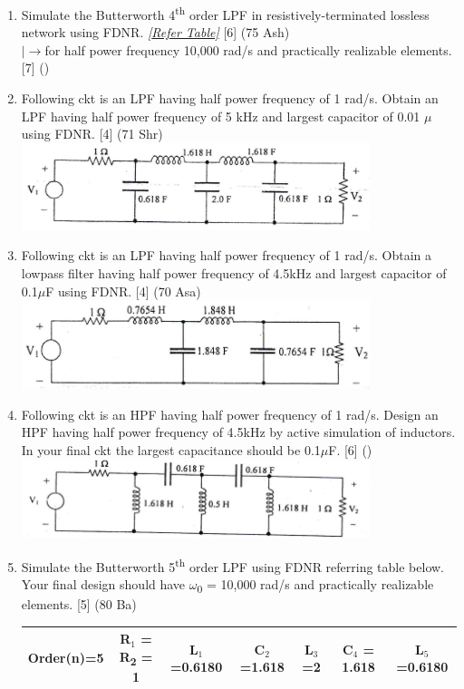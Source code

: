 \documentclass[12pt]{article}
\newcommand{\w}{\(\omega\)}
\newcommand{\lb}{\\$\left|\rightarrow\right.$}
\newcommand{\sub}[1]{\textsubscript{#1}}
\newcommand{\super}[1]{\textsuperscript{#1}}
\begin{document}
\begin{enumerate}
				\item Simulate the Butterworth 4\super{th} order LPF in resistively-terminated lossless network using FDNR. \textit{[\hyperref[sec:tables_81bh]{Refer Table]}} \hfill [6] (75 Ash)
				\lb for half power frequency 10,000 rad/s and practically realizable elements. \hfill [7] ()

				\item Following ckt is an LPF having half power frequency of 1 rad/s. Obtain an LPF having half power frequency of 5 kHz and largest capacitor of 0.01 $\mu$ using FDNR. \hfill [4] (71 Shr)\\
				\includegraphics[width=4in]{./pics/fd_22}

				\item Following ckt is an LPF having half power frequency of 1 rad/s. Obtain a lowpass filter having half power frequency of 4.5kHz and largest capacitor of 0.1$\mu$F using FDNR. \hfill [4] (70 Asa)\\
				\includegraphics[width=4in]{./pics/fd_8}

				\item Following ckt is an HPF having half power frequency of 1 rad/s. Design an HPF having half power frequency of 4.5kHz by active simulation of inductors. In your final ckt the largest capacitance should be 0.1$\mu$F. \hfill [6] ()\\
				\includegraphics[width=4in]{./pics/fd_24}

				\item Simulate the Butterworth 5\super{th} order LPF using FDNR referring table below. Your final design should have \w\sub{0} = 10,000 rad/s and practically realizable elements. \hfill [5] (80 Ba)\\
				\begin{tabular}{|c|c|c|c|c|c|c|}
					\hline
					Order(n)=5 & R$_1$ = R\sub{2} = 1 & L$_1$=0.6180 & C$_2$=1.618 & L$_3$=2 & C$_4$ = 1.618 & L$_5$=0.6180\\ \hline
				\end{tabular}
			\end{enumerate}
\end{document}
